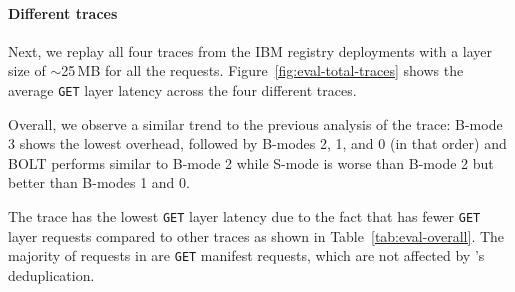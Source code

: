\paragraph{Different traces} Next, we replay all four traces from the IBM registry deployments
with a layer size of $\sim$25\,MB for all the requests.
%
%
Figure~\ref{fig:eval-total-traces} shows the average \texttt{GET} layer latency across the four different traces.


Overall, we observe a similar trend to the previous analysis of the
\dal trace: B-mode 3 shows the lowest overhead, followed by
B-modes 2, 1, and 0 (in that order) and BOLT performs similar to B-mode 2
while S-mode is worse than B-mode 2 but better than B-modes 1 and 0.

The \lon trace has the lowest \texttt{GET} layer latency due to the fact that
\lon has fewer \texttt{GET} layer requests compared to other traces as shown in Table~\ref{tab:eval-overall}. 
%
The majority of requests in \lon are \texttt{GET} manifest requests, which are not affected
by \sysname{}'s deduplication.
%


